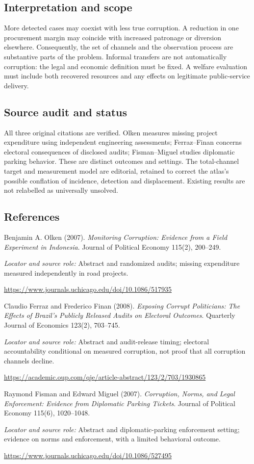 \documentclass[11pt,a4paper]{article}
\begin{document}
\subsection*{Interpretation and scope}
More detected cases may coexist with less true corruption. A reduction in one procurement margin may coincide with increased patronage or diversion elsewhere. Consequently, the set of channels and the observation process are substantive parts of the problem. Informal transfers are not automatically corruption: the legal and economic definition must be fixed. A welfare evaluation must include both recovered resources and any effects on legitimate public-service delivery.
\subsection*{Source audit and status}
All three original citations are verified. Olken measures missing project expenditure using independent engineering assessments; Ferraz--Finan concerns electoral consequences of disclosed audits; Fisman--Miguel studies diplomatic parking behavior. These are distinct outcomes and settings. The total-channel target and measurement model are editorial, retained to correct the atlas's possible conflation of incidence, detection and displacement. Existing results are not relabelled as universally unsolved.
\subsection*{References}
{\footnotesize\raggedright
\begin{enumerate}[label={\textbf{[S\arabic*]}},leftmargin=3em]
\item Benjamin A. Olken (2007). \emph{Monitoring Corruption: Evidence from a Field Experiment in Indonesia}. Journal of Political Economy 115(2), 200--249.\par
\textit{Locator and source role:} Abstract and randomized audits; missing expenditure measured independently in road projects.\par
\url{https://www.journals.uchicago.edu/doi/10.1086/517935}
\item Claudio Ferraz and Frederico Finan (2008). \emph{Exposing Corrupt Politicians: The Effects of Brazil's Publicly Released Audits on Electoral Outcomes}. Quarterly Journal of Economics 123(2), 703--745.\par
\textit{Locator and source role:} Abstract and audit-release timing; electoral accountability conditional on measured corruption, not proof that all corruption channels decline.\par
\url{https://academic.oup.com/qje/article-abstract/123/2/703/1930865}
\item Raymond Fisman and Edward Miguel (2007). \emph{Corruption, Norms, and Legal Enforcement: Evidence from Diplomatic Parking Tickets}. Journal of Political Economy 115(6), 1020--1048.\par
\textit{Locator and source role:} Abstract and diplomatic-parking enforcement setting; evidence on norms and enforcement, with a limited behavioral outcome.\par
\url{https://www.journals.uchicago.edu/doi/10.1086/527495}
\end{enumerate}
}
\end{document}
